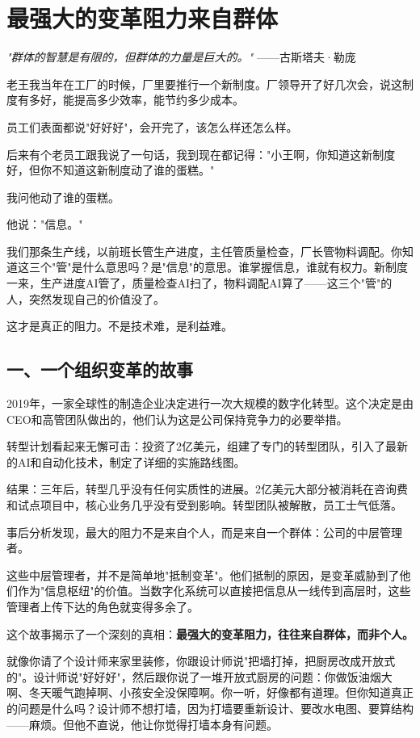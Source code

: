\chapter{最强大的变革阻力来自群体}


\textit{"群体的智慧是有限的，但群体的力量是巨大的。"}
——古斯塔夫·勒庞


老王我当年在工厂的时候，厂里要推行一个新制度。厂领导开了好几次会，说这制度有多好，能提高多少效率，能节约多少成本。

员工们表面都说"好好好"，会开完了，该怎么样还怎么样。

后来有个老员工跟我说了一句话，我到现在都记得："小王啊，你知道这新制度好，但你不知道这新制度动了谁的蛋糕。"

我问他动了谁的蛋糕。

他说："信息。"

我们那条生产线，以前班长管生产进度，主任管质量检查，厂长管物料调配。你知道这三个"管"是什么意思吗？是"信息"的意思。谁掌握信息，谁就有权力。新制度一来，生产进度AI管了，质量检查AI扫了，物料调配AI算了——这三个"管"的人，突然发现自己的价值没了。

这才是真正的阻力。不是技术难，是利益难。

\section{一、一个组织变革的故事}


2019年，一家全球性的制造企业决定进行一次大规模的数字化转型。这个决定是由CEO和高管团队做出的，他们认为这是公司保持竞争力的必要举措。

转型计划看起来无懈可击：投资了2亿美元，组建了专门的转型团队，引入了最新的AI和自动化技术，制定了详细的实施路线图。

结果：三年后，转型几乎没有任何实质性的进展。2亿美元大部分被消耗在咨询费和试点项目中，核心业务几乎没有受到影响。转型团队被解散，员工士气低落。

事后分析发现，最大的阻力不是来自个人，而是来自一个群体：公司的中层管理者。

这些中层管理者，并不是简单地"抵制变革"。他们抵制的原因，是变革威胁到了他们作为"信息枢纽"的价值。当数字化系统可以直接把信息从一线传到高层时，这些管理者上传下达的角色就变得多余了。

这个故事揭示了一个深刻的真相：\textbf{最强大的变革阻力，往往来自群体，而非个人。}

就像你请了个设计师来家里装修，你跟设计师说"把墙打掉，把厨房改成开放式的"。设计师说"好好好"，然后跟你说了一堆开放式厨房的问题：你做饭油烟大啊、冬天暖气跑掉啊、小孩安全没保障啊。你一听，好像都有道理。但你知道真正的问题是什么吗？设计师不想打墙，因为打墙要重新设计、要改水电图、要算结构——麻烦。但他不直说，他让你觉得打墙本身有问题。

